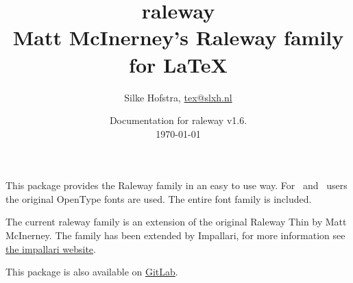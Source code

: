 \documentclass[10pt,a4paper,english]{article}
\title{\bfseries
	\Huge raleway\\
	\Large Matt McInerney’s Raleway family for \LaTeX
}
\author{Silke Hofstra, \href{mailto:tex@slxh.nl}{tex@slxh.nl}}
\date{Documentation for raleway v1.6.\\ \today}
\begin{document}
\maketitle
\begin{multicols}{2}
This package provides the Raleway family in an easy to use way. For \XeLaTeX\ and \LuaLaTeX\ users the original OpenType fonts are used. The entire font family is included.

The current raleway family is an extension of the original Raleway Thin by Matt McInerney. The family has been extended by Impallari, for more information see \href{http://www.impallari.com/projects/overview/matt-mcinerneys-raleway-family}{the impallari website}.

This package is also available on \href{https://gitlab.com/slxh/latex/raleway}{GitLab}.


\end{multicols}
\end{document}
